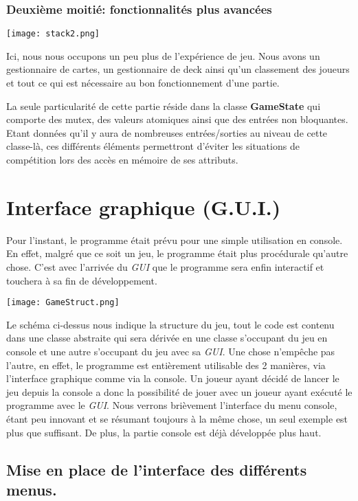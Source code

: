 \documentclass[12pt]{article}
\begin{document}
			\newpage
			\subsubsection{Deuxième moitié: fonctionnalités plus avancées}
			\begin{center}\texttt{[image: stack2.png]}\end{center}
				Ici, nous nous occupons un peu plus de l'expérience de jeu. Nous avons un gestionnaire de cartes, un gestionnaire de \gls{deck} ainsi qu'un classement des joueurs et tout ce qui est nécessaire au bon fonctionnement d'une partie.

				La seule particularité de cette partie réside dans la classe \textbf{GameState} qui comporte des \gls{mutex}, des valeurs atomiques ainsi que des entrées non bloquantes.
				Etant données qu'il y aura de nombreuses entrées/sorties au niveau de cette classe-là, ces différents éléments permettront d'éviter les situations de compétition lors des accès en mémoire de ses attributs.
				
\newpage
\section{Interface graphique (G.U.I.)}
	Pour l'instant, le programme était prévu pour une simple utilisation en console. En effet, malgré que ce soit un jeu, le programme était plus procédurale qu'autre chose.
	C'est avec l'arrivée du \textit{\gls{GUI}} que le programme sera enfin interactif et touchera à sa fin de développement.

	\begin{center}\texttt{[image: GameStruct.png]}\end{center}
	Le schéma ci-dessus nous indique la structure du jeu, tout le code est contenu dans une classe abstraite qui sera dérivée en une classe s'occupant du jeu en console et une autre s'occupant du jeu avec sa \textit{\gls{GUI}}.
	Une chose n'empêche pas l'autre, en effet, le programme est entièrement utilisable des 2 manières, via l'interface graphique comme via la console.
	Un joueur ayant décidé de lancer le jeu depuis la console a donc la possibilité de jouer avec un joueur ayant exécuté le programme avec le \textit{\gls{GUI}}.
	Nous verrons brièvement l'interface du menu console, étant peu innovant et se résumant toujours à la même chose, un seul exemple est plus que suffisant. De plus, la partie console est déjà développée plus haut.


	\subsection{Mise en place de l'interface des différents menus.}
\end{document}
